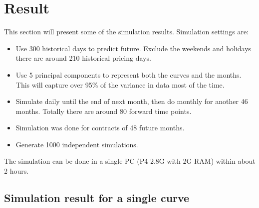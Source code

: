 \section{Result}
This section will present some of the  simulation results.
Simulation settings are:
\begin{itemize}
\item Use 300 historical days to predict future. 
Exclude the weekends and holidays there are around 210
historical pricing days.
\item Use 5 principal components to represent both the curves
and the months. This will capture over 95\% of the variance in data
most of the time.
\item Simulate daily until the end of next month, then do monthly
for another 46 months. Totally there are around 80 forward time points.
\item Simulation was done for contracts of 48 future months.
\item Generate 1000 independent simulations.
\end{itemize}
The simulation can be done in a single PC (P4 2.8G with 2G RAM)
within about 2 hours.

\subsection{Simulation result for a single curve}

